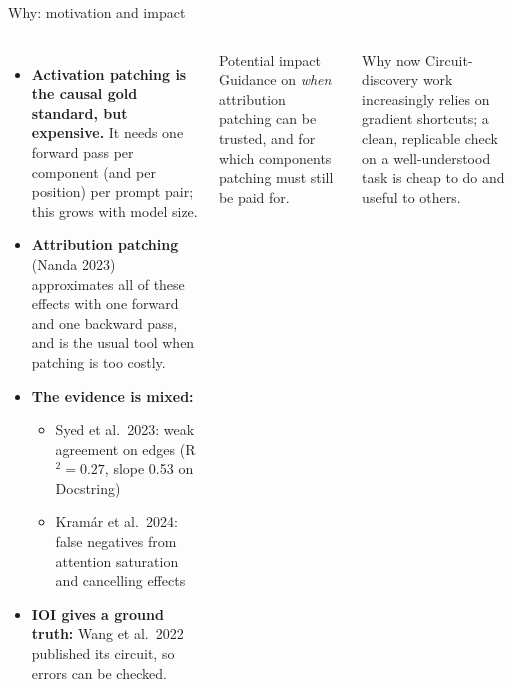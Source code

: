 \documentclass[aspectratio=169,10pt]{beamer}
\begin{document}
\begin{frame}{Why: motivation and impact}
\begin{columns}[T]
\begin{itemize}
\item \textbf{Activation patching is the causal gold standard, but expensive.} It needs one forward pass per component (and per position) per prompt pair; this grows with model size.
\item \textbf{Attribution patching} (Nanda 2023) approximates all of these effects with one forward and one backward pass, and is the usual tool when patching is too costly.
\item \textbf{The evidence is mixed:}
 \begin{itemize}
 \item Syed et al.\ 2023: weak agreement on edges (R$^2{=}0.27$, slope 0.53 on Docstring)
 \item Kramár et al.\ 2024: false negatives from attention saturation and cancelling effects
 \end{itemize}
\item \textbf{IOI gives a ground truth:} Wang et al.\ 2022 published its circuit, so errors can be checked.
\end{itemize}
\begin{block}{Potential impact}
Guidance on \emph{when} attribution patching can be trusted, and for which components patching must still be paid for.
\end{block}
\begin{block}{Why now}
Circuit-discovery work increasingly relies on gradient shortcuts; a clean, replicable check on a well-understood task is cheap to do and useful to others.
\end{block}
\end{columns}
\end{frame}
\end{document}
